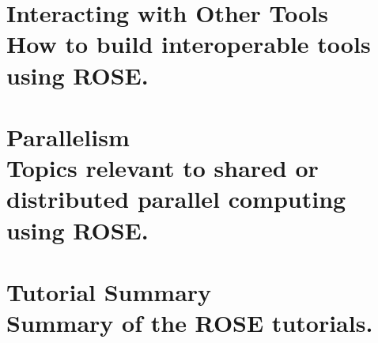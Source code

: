 \documentclass[10pt]{book}
\begin{document}
\part[Interacting with Other Tools]{ Interacting with Other Tools \\
\vspace{1.0in}
\normalsize{How to build interoperable tools using ROSE.}
}





\part[Parallelism]{ Parallelism \\
\vspace{1.0in}
\normalsize{Topics relevant to shared or distributed parallel computing using ROSE.}
}





\part[Tutorial Summary]{ Tutorial Summary \\
\vspace{1.0in}
\normalsize{Summary of the ROSE tutorials.}
}

\backmatter



\end{document}
